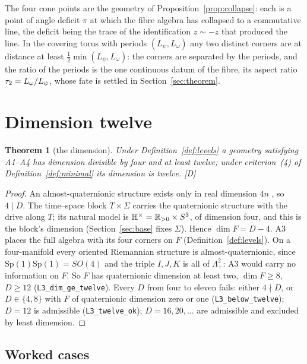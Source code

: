 \documentclass[11pt,a4paper]{article}
\theoremstyle{plain}
\newtheorem{theorem}{Theorem}[section]
\theoremstyle{definition}
\theoremstyle{remark}
\newcommand{\Hquat}{\mathbb{H}}
\newcommand{\rigD}{[\textup{D}]}
\begin{document}
The four cone points are the geometry of Proposition~\ref{prop:collapse}: each is a point of angle deficit $\pi$ at which the fibre algebra has collapsed to a commutative line, the deficit being the trace of the identification $z\sim-z$ that produced the line. In the covering torus with periods $(L_{\psi},L_{\omega})$ any two distinct corners are at distance at least $\tfrac12\min(L_{\psi},L_{\omega})$: the corners are separated by the periods, and the ratio of the periods is the one continuous datum of the fibre, its aspect ratio $\tau_2=L_{\omega}/L_{\psi}$, whose fate is settled in Section~\ref{sec:theorem}.

\section{Dimension twelve}\label{sec:dimension}

\begin{theorem}[the dimension]\label{thm:dim}
Under Definition~\ref{def:levels} a geometry satisfying A1--A4 has dimension divisible by four and at least twelve; under criterion~(4) of Definition~\ref{def:minimal} its dimension is twelve. \rigD
\end{theorem}

\begin{proof}
An almost-quaternionic structure exists only in real dimension $4n$ \cite{Salamon1982}, so $4\mid D$. The time--space block $T\times\Sigma$ carries the quaternionic structure with the drive along $T$; its natural model is $\Hquat^{\times}=\R_{>0}\times S^{3}$, of dimension four, and this is the block's dimension (Section~\ref{sec:base} fixes $\Sigma$). Hence $\dim F=D-4$. A3 places the full algebra with its four corners on $F$ (Definition~\ref{def:levels}). On a four-manifold every oriented Riemannian structure is almost-quaternionic, since $\mathrm{Sp}(1)\mathrm{Sp}(1)=SO(4)$ and the triple $I,J,K$ is all of $\Lambda^{2}_{+}$: A3 would carry no information on $F$. So $F$ has quaternionic dimension at least two, $\dim F\geq8$, $D\geq12$ (\texttt{L3\_dim\_ge\_twelve}). Every $D$ from four to eleven fails: either $4\nmid D$, or $D\in\{4,8\}$ with $F$ of quaternionic dimension zero or one (\texttt{L3\_below\_twelve}); $D=12$ is admissible (\texttt{L3\_twelve\_ok}); $D=16,20,\dots$ are admissible and excluded by least dimension.
\end{proof}

\subsection{Worked cases}\label{sec:dim-worked}
\end{document}

